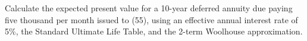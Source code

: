Calculate the expected present value for a 10-year deferred annuity due paying five thousand per month issued to (55), using
an effective annual interest rate of 5\%, the Standard Ultimate Life Table, and the 2-term Woolhouse approximation. 
 
